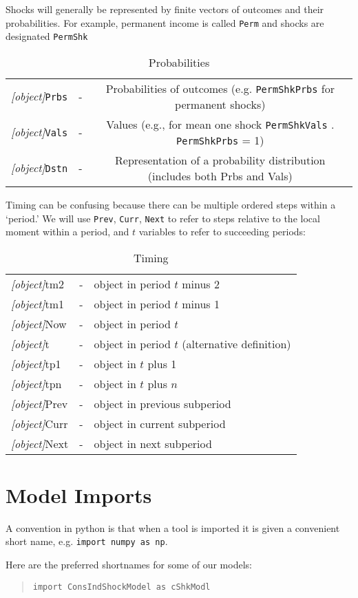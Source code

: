 \documentclass[12pt]{econtex}
\begin{document}
Shocks will generally be represented by finite vectors of outcomes and their probabilities.  For example, permanent income is called \texttt{Perm} and shocks are designated \texttt{PermShk}
\begin{table}[ht]
	\centering
	\begin{tabular}{|>{\ttfamily}ccc|} 		
		\hline
   \textit{[object]}\texttt{Prbs} & - & Probabilities of outcomes (e.g. \texttt{PermShkPrbs} for permanent shocks) 
\\ \textit{[object]}\texttt{Vals} & - & Values (e.g., for mean one shock \texttt{PermShkVals} . \texttt{PermShkPrbs} = 1) 
\\ \textit{[object]}\texttt{Dstn} & - & Representation of a probability distribution (includes both Prbs and Vals)
\\ 	\hline
	\end{tabular}
	\caption{Probabilities}
	\label{table:Probabilities}
\end{table}	

Timing can be confusing because there can be multiple ordered steps 
within a `period.'  We will use \texttt{Prev}, \texttt{Curr}, \texttt{Next} to refer
to steps relative to the local moment within a period, and $t$ variables to refer to succeeding periods:
\begin{table}[ht]
	\centering 
	\begin{tabular}{|>{\ttfamily}lcl|} 		
		\hline
   \textit{[object]}tm2 & - & object in period $t$ minus 2 
\\ \textit{[object]}tm1 & - & object in period $t$ minus 1 
\\ \textit{[object]}Now & - & object in period $t$
\\ \textit{[object]}t\phantom{p1}   & - & object in period $t$ (alternative definition)
\\ \textit{[object]}tp1 & - & object in $t$ plus 1 
\\ \textit{[object]}tpn & - & object in $t$ plus $n$ 
\\ \textit{[object]}Prev & - & object in previous subperiod
\\ \textit{[object]}Curr & - & object in current subperiod
\\ \textit{[object]}Next & - & object in next subperiod
\\	\hline
	\end{tabular}
	\caption{Timing}
	\label{table:Timing}
\end{table}	

\section{Model Imports}

A convention in python is that when a tool is imported it is given a convenient short name,
e.g. \texttt{import numpy as np}.

Here are the preferred shortnames for some of our models:

\begin{quote}
  \texttt{import ConsIndShockModel as cShkModl}
\end{quote}

\vfill\eject\pagebreak\newpage 



\end{document}
